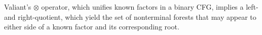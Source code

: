 \documentclass[portrait,a0b,final,a4resizeable]{a0poster}
\def\jointspacing{\vspace{0.3in}}
\begin{document}
\begin{poster}
\begin{multicols}{2}
%
%
%

      {\huge
      \hspace*{2.5cm}\begin{minipage}[c]{0.90\columnwidth}
         \vspace{1cm}Valiant's $\otimes$ operator, which unifies known factors in a binary CFG, implies a left- and right-quotient, which yield the set of nonterminal forests that may appear to either side of a known factor and its corresponding root.\\
       \end{minipage}
      }


\end{multicols}
\end{poster}
\end{document}
